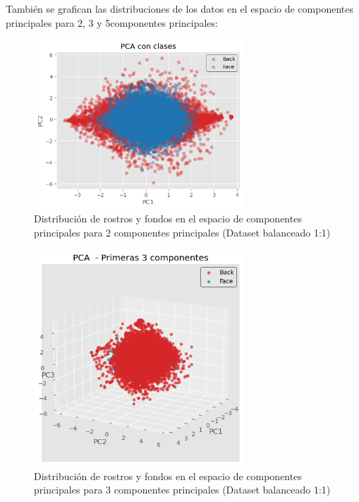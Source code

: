 \documentclass{article}
\begin{document}
También se grafican las distribuciones de los datos en el espacio de componentes principales para 2, 3 y 5componentes principales: 

\begin{figure}[H]
    \centering
    \includegraphics[width=0.7\textwidth]{tarea_2/imagenes/pca_classes_x1_v1_50_2_components.png}
    \caption{Distribución de rostros y fondos en el espacio de componentes principales para 2 componentes principales (Dataset balanceado 1:1)}
    \label{fig:pca_classes}
\end{figure}

\begin{figure}[H]
    \centering
    \includegraphics[width=0.7\textwidth]{tarea_2/imagenes/pca_classes_x1_v1_50_3_components.png}
    \caption{Distribución de rostros y fondos en el espacio de componentes principales para 3 componentes principales (Dataset balanceado 1:1)}
    \label{fig:pca_classes}
\end{figure}
\end{document}
